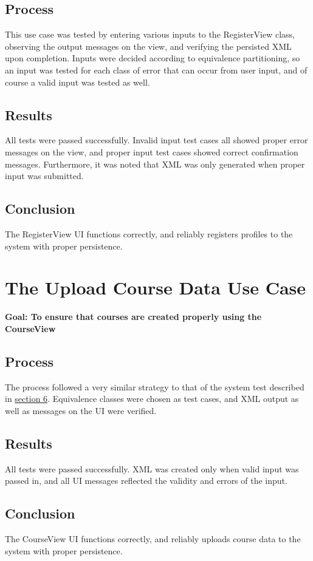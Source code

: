 \documentclass[12pt]{report}
\begin{document}
\subsection*{Process}
This use case was tested by entering various inputs to the RegisterView class, observing the output
messages on the view, and verifying the persisted XML upon completion. Inputs were decided according
to equivalence partitioning, so an input was tested for each class of error that can occur from user
input, and of course a valid input was tested as well.
\subsection*{Results}
All tests were passed successfully. Invalid input test cases all showed proper error messages on the
view, and proper input test cases showed correct confirmation messages. Furthermore, it was noted
that XML was only generated when proper input was submitted.
\subsection*{Conclusion}
The RegisterView UI functions correctly, and reliably registers profiles to the system with proper
persistence.

\section{The Upload Course Data Use Case}
\textbf{Goal: To ensure that courses are created properly using the CourseView}
\subsection*{Process}
The process followed a very similar strategy to that of the system test described in
\hyperref[s:six]{section 6}. Equivalence classes were chosen as test cases, and XML output as well
as messages on the UI were verified.
\subsection*{Results}
All tests were passed successfully. XML was created only when valid input was passed in, and all UI
messages reflected the validity and errors of the input.
\subsection*{Conclusion}
The CourseView UI functions correctly, and reliably uploads course data to the system with proper
persistence.
\end{document}
